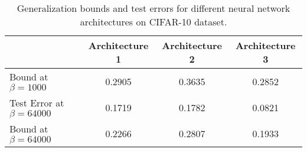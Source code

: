 
\begin{table}[h]
\centering
\begin{tabular}{|l|c|c|c|}
\hline
& Architecture 1 & Architecture 2 & Architecture 3 \\
\hline
Bound at $\beta = 1000$ & 0.2905 & 0.3635 & 0.2852 \\
\hline
Test Error at $\beta = 64000$ & 0.1719 & 0.1782 & 0.0821 \\
\hline
Bound at $\beta = 64000$ & 0.2266 & 0.2807 & 0.1933 \\
\hline
\end{tabular}
\caption{Generalization bounds and test errors for different neural network architectures on CIFAR-10 dataset.}
\label{tab:cifar_results}
\end{table}
